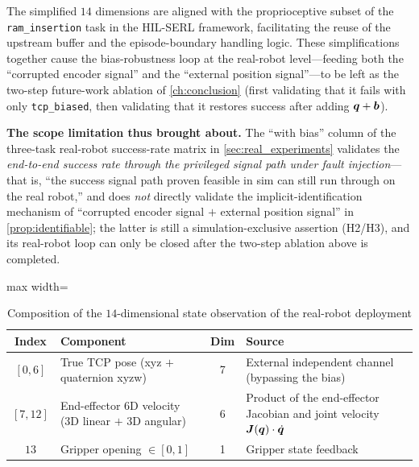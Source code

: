 The simplified $14$ dimensions are aligned with the proprioceptive subset of the \texttt{ram\_insertion} task in the HIL-SERL framework, facilitating the reuse of the upstream buffer and the episode-boundary handling logic. These simplifications together cause the bias-robustness loop at the real-robot level---feeding both the ``corrupted encoder signal'' and the ``external position signal''---to be left as the two-step future-work ablation of \cref{ch:conclusion} (first validating that it fails with only \texttt{tcp\_biased}, then validating that it restores success after adding $\bm{q}+\bm{b}$).

\textbf{The scope limitation thus brought about.} The ``with bias'' column of the three-task real-robot success-rate matrix in \cref{sec:real_experiments} validates the \emph{end-to-end success rate through the privileged signal path under fault injection}---that is, ``the success signal path proven feasible in sim can still run through on the real robot,'' and does \emph{not} directly validate the implicit-identification mechanism of ``corrupted encoder signal $+$ external position signal'' in \cref{prop:identifiable}; the latter is still a simulation-exclusive assertion (H2/H3), and its real-robot loop can only be closed after the two-step ablation above is completed.

\begin{table}[htbp]
  \centering
  \caption{Composition of the $14$-dimensional state observation of the real-robot deployment}
  \label{tab:obs_real_14d}
  \small
  \begin{adjustbox}{max width=\textwidth}
  \begin{tabular}{@{}clcl@{}}
    \toprule
    Index & Component & Dim & Source \\
    \midrule
    $[0, 6]$  & True TCP pose (xyz $+$ quaternion xyzw) & 7 & External independent channel (bypassing the bias) \\
    $[7, 12]$ & End-effector 6D velocity (3D linear $+$ 3D angular) & 6 & Product of the end-effector Jacobian and joint velocity $\bm{J}(\bm{q}) \cdot \dot{\bm{q}}$ \\
    $13$      & Gripper opening $\in [0, 1]$ & 1 & Gripper state feedback \\
    \bottomrule
  \end{tabular}
  \end{adjustbox}
\end{table}

